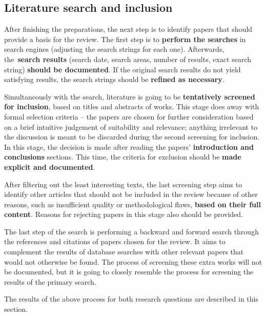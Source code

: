 \subsection{Literature search and inclusion}\label{subsec:literature-search-inclusion}

After finishing the preparations, the next step is to identify papers that should provide a basis for the review.
The first step is to \textbf{perform the searches} in search engines (adjusting the search strings for each one).
Afterwards, the\ \textbf{search results} (search date, search areas, number of results, exact search string) \textbf{should be documented}.
If the original search results do not yield satisfying results, the search strings should be \textbf{refined as necessary}.

Simultaneously with the search, literature is going to be \textbf{tentatively screened for inclusion}, based on titles and abstracts of works.
This stage does away with formal selection criteria -- the papers are chosen for further consideration based on a brief intuitive judgement of suitability and relevance;
anything irrelevant to the discussion is meant to be discarded during the second screening for inclusion.
In this stage, the decision is made after reading the papers' \textbf{introduction and conclusions} sections.
This time, the criteria for exclusion should be \textbf{made explicit and documented}.

After filtering out the least interesting texts, the last screening step aims to identify other articles
that should not be included in the review because of other reasons, such as insufficient quality or methodological flaws,
\textbf{based on their full content}.
Reasons for rejecting papers in this stage also should be provided.

The last step of the search is performing a backward and forward search through the references and citations of papers chosen for the review.
It aims to complement the results of database searches with other relevant papers that would not otherwise be found.
The process of screening these extra works will not be documented, but it is going to closely resemble the process for screening the results of the primary search.

The results of the above process for both research questions are described in this section.




